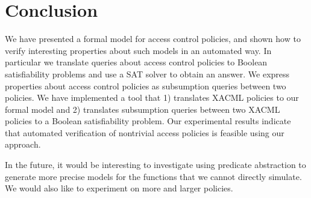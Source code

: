 \section{Conclusion}

We have presented a formal model for access control policies, and
shown how to verify interesting properties about such models in an
automated way.  In particular we translate queries about access
control policies to Boolean satisfiability problems and use a SAT
solver to obtain an answer.  We express properties about access
control policies as subsumption queries between two policies.  We have
implemented a tool that 1) translates XACML policies to our formal
model and 2) translates subsumption queries between two XACML policies
to a Boolean satisfiability problem.  Our experimental results
indicate that automated verification of nontrivial access policies is
feasible using our approach.

In the future, it would be interesting to investigate using predicate
abstraction to generate more precise models for the functions that we
cannot directly simulate.  We would also like to experiment on more
and larger policies.


